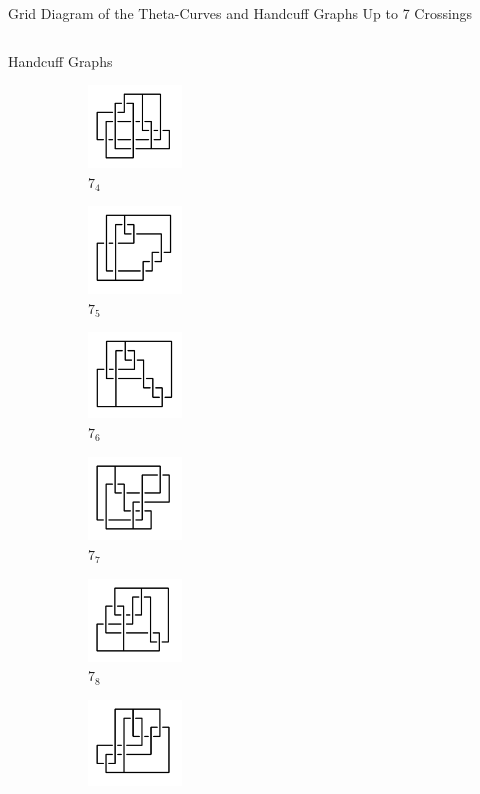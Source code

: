\documentclass[final]{beamer}
\begin{document}
\begin{frame}[t]
\begin{alertblock}{Grid Diagram of the Theta-Curves and Handcuff Graphs Up to 7 Crossings}
\begin{columns}[t]
\begin{column}{0.3\textwidth}
\begin{alertblock}{Handcuff Graphs}
\begin{figure}
\begin{subfigure}{0.15\textwidth}
    \includegraphics[width=2.5cm]{../Midterm_Poster/grid_diagram/handcuff_7_4.png}
    \caption{$7_{4}$} 
    \end{subfigure}
    \begin{subfigure}{0.15\textwidth}
    \includegraphics[width=2.5cm]{../Midterm_Poster/grid_diagram/handcuff_7_5.png}
    \caption{$7_{5}$} 
    \end{subfigure}
    \begin{subfigure}{0.15\textwidth}
    \includegraphics[width=2.5cm]{../Midterm_Poster/grid_diagram/handcuff_7_6.png}
    \caption{$7_{6}$} 
    \end{subfigure}
    \begin{subfigure}{0.15\textwidth}
    \includegraphics[width=2.5cm]{../Midterm_Poster/grid_diagram/handcuff_7_7.png}
    \caption{$7_{7}$} 
    \end{subfigure}
    \begin{subfigure}{0.15\textwidth}
    \includegraphics[width=2.5cm]{../Midterm_Poster/grid_diagram/handcuff_7_8.png}
    \caption{$7_{8}$} 
    \end{subfigure}
    \begin{subfigure}{0.15\textwidth}
    \includegraphics[width=2.5cm]{../Midterm_Poster/grid_diagram/handcuff_7_9.png}

\end{subfigure}
\end{figure}
\end{alertblock}
\end{column}
\end{columns}
\end{alertblock}
\end{frame}
\end{document}

